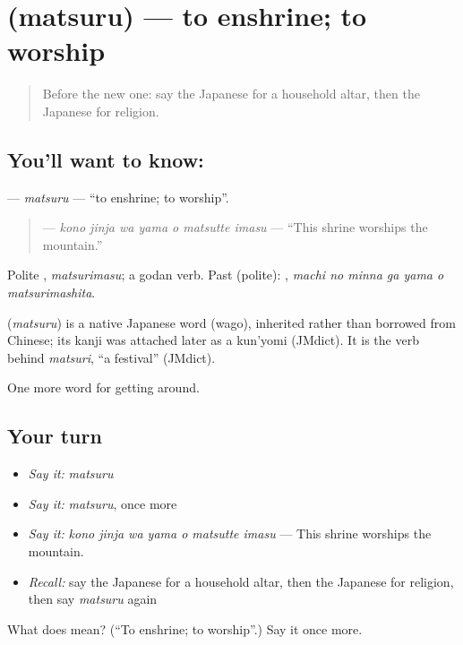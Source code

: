 \section[\texorpdfstring{\ja{まつる} (matsuru)}{まつる (matsuru)}]{ (matsuru) — to enshrine; to worship}

\label{lesson:JA-C408-matsuru}



\begin{quote}
Before the new one: say the Japanese for a household altar, then the Japanese for religion.
\end{quote}

\subsection*{You'll want to know: }
\textbf{} — \emph{matsuru} — \textquotedblleft{}to enshrine; to worship\textquotedblright{}.

\begin{quote}
\textbf{   } — \emph{kono jinja wa yama o matsutte imasu} — \textquotedblleft{}This shrine worships the mountain.\textquotedblright{}
\end{quote}

Polite \textbf{}, \emph{matsurimasu}; a godan verb. Past (polite): \textbf{   }, \emph{machi no minna ga yama o matsurimashita}.

\begin{cousinweb}
\textbf{} (\emph{matsuru}) is a native Japanese word (wago), inherited rather than borrowed from Chinese; its kanji was attached later as a kun'yomi (JMdict). It is the verb behind \emph{matsuri}, \textquotedblleft{}a festival\textquotedblright{} (JMdict).
\end{cousinweb}

\begin{grammarlens}[title={What you've built}]
One more word for getting around.
\end{grammarlens}

\subsection*{Your turn}
\begin{itemize}
\raggedright
  \item \emph{Say it:} \emph{matsuru}
  \item \emph{Say it:} \emph{matsuru}, once more
  \item \emph{Say it:} \emph{kono jinja wa yama o matsutte imasu} — This shrine worships the mountain.
  \item \emph{Recall:} say the Japanese for a household altar, then the Japanese for religion, then say \emph{matsuru} again
\end{itemize}

\begin{tcolorbox}[breakable,colback=teal!4,colframe=teal!35!black,title={Before you move on}]
What does  mean? (\textquotedblleft{}To enshrine; to worship\textquotedblright{}.) Say it once more.
\end{tcolorbox}
